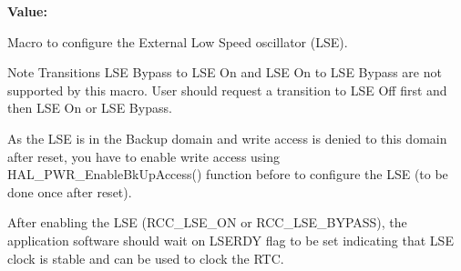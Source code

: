 {\bfseries Value\+:}
\begin{DoxyCode}{0}
\DoxyCodeLine{\textcolor{keywordflow}{do} \{                                       \(\backslash\)}
\DoxyCodeLine{                      \{                                        \(\backslash\)}
\DoxyCodeLine{                      \}                                        \(\backslash\)}
\DoxyCodeLine{                      \{                                        \(\backslash\)}
\DoxyCodeLine{                      \}                                        \(\backslash\)}
\DoxyCodeLine{                      \{                                        \(\backslash\)}
\DoxyCodeLine{                      \}                                        \(\backslash\)}
\DoxyCodeLine{                      \{                                        \(\backslash\)}
\DoxyCodeLine{                      \}                                        \(\backslash\)}

\end{DoxyCode}


Macro to configure the External Low Speed oscillator (L\+SE). 

\begin{DoxyNote}{Note}
Transitions L\+SE Bypass to L\+SE On and L\+SE On to L\+SE Bypass are not supported by this macro. User should request a transition to L\+SE Off first and then L\+SE On or L\+SE Bypass.

As the L\+SE is in the Backup domain and write access is denied to this domain after reset, you have to enable write access using H\+A\+L\+\_\+\+P\+W\+R\+\_\+\+Enable\+Bk\+Up\+Access() function before to configure the L\+SE (to be done once after reset).

After enabling the L\+SE (R\+C\+C\+\_\+\+L\+S\+E\+\_\+\+ON or R\+C\+C\+\_\+\+L\+S\+E\+\_\+\+B\+Y\+P\+A\+SS), the application software should wait on L\+S\+E\+R\+DY flag to be set indicating that L\+SE clock is stable and can be used to clock the R\+TC. 
\end{DoxyNote}


